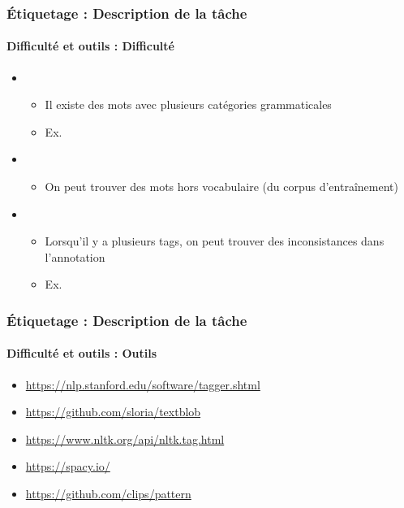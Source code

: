 \documentclass[xcolor=table]{beamer}
\begin{document}
\begin{frame}
\frametitle{Étiquetage : Description de la tâche}
\framesubtitle{Difficulté et outils : Difficulté}

\begin{itemize}
	\item {}
	\begin{itemize}
		\item Il existe des mots avec plusieurs catégories grammaticales
		\item Ex. 
	\end{itemize}
	\item {}
	\begin{itemize}
		\item On peut trouver des mots hors vocabulaire (du corpus d'entraînement)
	\end{itemize}
	\item {} 
	\begin{itemize}
		\item Lorsqu'il y a plusieurs tags, on peut trouver des inconsistances dans l'annotation
		\item Ex. 
	\end{itemize}
\end{itemize}

\end{frame}

\begin{frame}
\frametitle{Étiquetage : Description de la tâche}
\framesubtitle{Difficulté et outils : Outils}

\begin{itemize}
	\item \url{https://nlp.stanford.edu/software/tagger.shtml}
	\item \url{https://github.com/sloria/textblob}
	\item \url{https://www.nltk.org/api/nltk.tag.html}
	\item \url{https://spacy.io/}
	\item \url{https://github.com/clips/pattern}
\end{itemize}

\end{frame}
\end{document}
